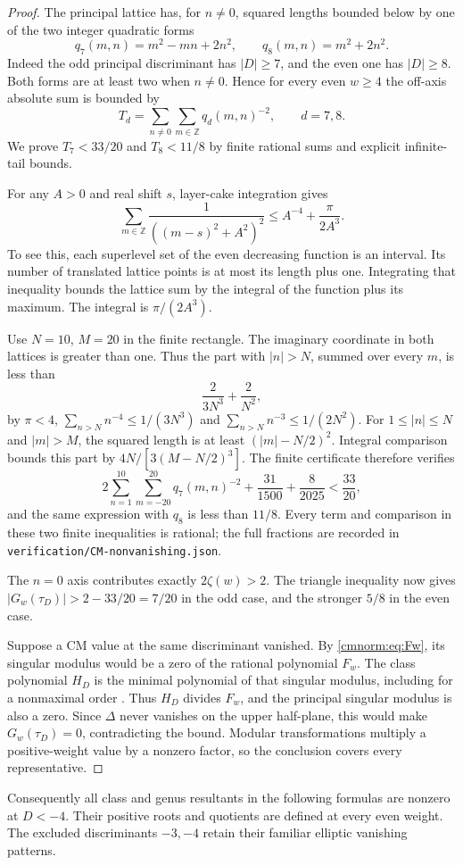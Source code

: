 \begin{proof}
The principal lattice has, for $n\ne0$, squared lengths bounded below by
one of the two integer quadratic forms
\[
 q_7(m,n)=m^2-mn+2n^2,\qquad q_8(m,n)=m^2+2n^2.
\]
Indeed the odd principal discriminant has $|D|\ge7$, and the even one
has $|D|\ge8$. Both forms are at least two when $n\ne0$. Hence for every
even $w\ge4$ the off-axis absolute sum is bounded by
\[
 T_d=\sum_{n\ne0}\sum_{m\in\mathbb Z}q_d(m,n)^{-2},\qquad d=7,8.
\]
We prove $T_7<33/20$ and $T_8<11/8$ by finite rational sums and explicit
infinite-tail bounds.

For any $A>0$ and real shift $s$, layer-cake integration gives
\[
 \sum_{m\in\mathbb Z}\frac1{((m-s)^2+A^2)^2}
 \le A^{-4}+\frac{\pi}{2A^3}.
\]
To see this, each superlevel set of the even decreasing function is an
interval. Its number of translated lattice points is at most its length
plus one. Integrating that inequality bounds the lattice sum by the
integral of the function plus its maximum. The integral is $\pi/(2A^3)$.

Use $N=10$, $M=20$ in the finite rectangle. The imaginary coordinate in
both lattices is greater than one. Thus the part with $|n|>N$, summed
over every $m$, is less than
\[
 \frac2{3N^3}+\frac2{N^2},
\]
by $\pi<4$, $\sum_{n>N}n^{-4}\le1/(3N^3)$ and
$\sum_{n>N}n^{-3}\le1/(2N^2)$. For $1\le |n|\le N$ and $|m|>M$,
the squared length is at least $(|m|-N/2)^2$. Integral comparison bounds
this part by $4N/[3(M-N/2)^3]$. The finite certificate therefore verifies
\[
 2\sum_{n=1}^{10}\sum_{m=-20}^{20}q_7(m,n)^{-2}
       +\frac{31}{1500}+\frac8{2025}<\frac{33}{20},
\]
and the same expression with $q_8$ is less than $11/8$. Every term and
comparison in these two finite inequalities is rational; the full fractions
are recorded in \texttt{verification/CM-nonvanishing.json}.

The $n=0$ axis contributes exactly $2\zeta(w)>2$. The triangle inequality
now gives $|G_w(\tau_D)|>2-33/20=7/20$ in the odd case, and the stronger
$5/8$ in the even case.

Suppose a CM value at the same discriminant vanished. By
\eqref{cmnorm:eq:Fw}, its singular modulus would be a zero of the rational
polynomial $F_w$. The class polynomial $H_D$ is the minimal polynomial of
that singular modulus, including for a nonmaximal order
\cite{cmnorm:Sutherland,cm:Cox}. Thus $H_D$ divides $F_w$, and the
principal singular modulus is also a zero. Since $\Delta$ never vanishes
on the upper half-plane, this would make $G_w(\tau_D)=0$, contradicting
the bound. Modular transformations multiply a positive-weight value by a
nonzero factor, so the conclusion covers every representative.
\end{proof}

Consequently all class and genus resultants in the following formulas are
nonzero at $D<-4$. Their positive roots and quotients are defined at every
even weight. The excluded discriminants $-3,-4$ retain their familiar
elliptic vanishing patterns.
